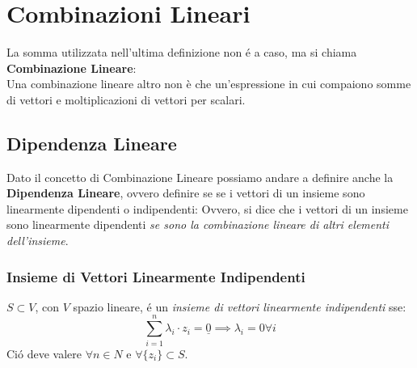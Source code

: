 \pagebreak
\section{Combinazioni Lineari}
La somma utilizzata nell'ultima definizione non é a caso, ma si chiama \textbf{Combinazione Lineare}:
\\Una combinazione lineare altro non è che un'espressione in cui compaiono somme di vettori e moltiplicazioni di vettori per scalari.

\subsection{Dipendenza Lineare}
Dato il concetto di Combinazione Lineare possiamo andare a definire anche la \textbf{Dipendenza Lineare}, ovvero definire se 
se i vettori di un insieme sono linearmente dipendenti o indipendenti:
Ovvero, si dice che i vettori di un insieme sono linearmente dipendenti \emph{se sono la combinazione lineare di altri elementi dell'insieme}.
\subsubsection*{Insieme di Vettori Linearmente Indipendenti}
$S \subset V$, con $V$ spazio lineare, é un \emph{insieme di vettori linearmente indipendenti} sse:
\[ \sum_{i=1}^{n} \lambda_i \cdot z_i = \underline{0} \implies \lambda_i = 0 \forall i \]
Ció deve valere $\forall n \in N$ e $\forall \{z_i\} \subset S$.
